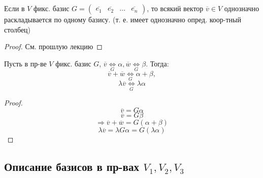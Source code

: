 \begin{statement}
    Если в $V$ фикс. базис $G = \begin{pmatrix}\overline{e_1} & \overline{e_2} & \ldots & \overline{e_n} \end{pmatrix}$, то всякий вектор $\overline{v} \in V$ однозначно раскладывается по одному базису. (т. е. имеет однозначно опред. коор-тный столбец)
\end{statement}
\begin{proof}
См. прошлую лекцию
\end{proof}
\begin{statement}
Пусть в пр-ве $V$ фикс. базис $G$, $\overline{v} \underset{G}{\Longleftrightarrow} \alpha, \overline{w} \underset{G}{\Longleftrightarrow} \beta$. Тогда:
\[
\overline{v} + \overline{w} \underset{G}{\Longleftrightarrow} \alpha + \beta,
\] 
\[
\lambda \overline{v} \underset{G}{\Longleftrightarrow} \lambda \alpha
\] 
\end{statement}
\begin{proof}
\[
\overline{v} = G \alpha
\] 
\[
\overline{v} = G \beta
\] 
\[
\Rightarrow \overline{v} + \overline{w} = G(\alpha + \beta)
\] 
\[
\lambda \overline{v} = \lambda G \alpha = G (\lambda \alpha)
\] 
\end{proof}
\subsection{Описание базисов в пр-вах $V_1, V_2, V_3$}

